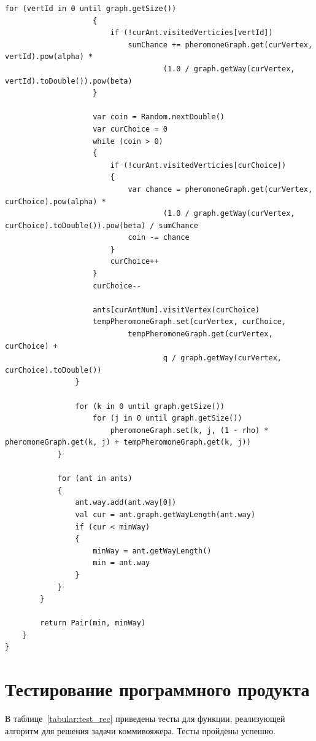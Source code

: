 \documentclass[12pt]{report}
\begin{document}
\begin{lstlisting}[caption=Класс реализации муравьиного алгоритма для решения задачи коммивояжера,
label={list:Colony}]
                    for (vertId in 0 until graph.getSize())
                    {
                        if (!curAnt.visitedVerticies[vertId])
                            sumChance += pheromoneGraph.get(curVertex, vertId).pow(alpha) *
                                    (1.0 / graph.getWay(curVertex, vertId).toDouble()).pow(beta)
                    }

                    var coin = Random.nextDouble()
                    var curChoice = 0
                    while (coin > 0)
                    {
                        if (!curAnt.visitedVerticies[curChoice])
                        {
                            var chance = pheromoneGraph.get(curVertex, curChoice).pow(alpha) *
                                    (1.0 / graph.getWay(curVertex, curChoice).toDouble()).pow(beta) / sumChance
                            coin -= chance
                        }
                        curChoice++
                    }
                    curChoice--

                    ants[curAntNum].visitVertex(curChoice)
                    tempPheromoneGraph.set(curVertex, curChoice,
                            tempPheromoneGraph.get(curVertex, curChoice) +
                                    q / graph.getWay(curVertex, curChoice).toDouble())
                }

                for (k in 0 until graph.getSize())
                    for (j in 0 until graph.getSize())
                        pheromoneGraph.set(k, j, (1 - rho) * pheromoneGraph.get(k, j) + tempPheromoneGraph.get(k, j))
            }

            for (ant in ants)
            {
                ant.way.add(ant.way[0])
                val cur = ant.graph.getWayLength(ant.way)
                if (cur < minWay)
                {
                    minWay = ant.getWayLength()
                    min = ant.way
                }
            }
        }

        return Pair(min, minWay)
    }
}
\end{lstlisting}

\section{Тестирование программного продукта}
В таблице~\ref{tabular:test_rec} приведены тесты для функции, реализующей алгоритм для решения задачи коммивояжера. Тесты пройдены успешно.
\end{document}
